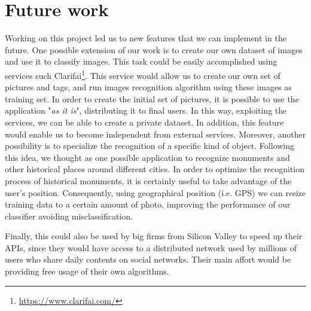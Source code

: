 \section{Future work}
\label{sec:future}

Working on this project led us to new features that we can implement in the 
future.
One possible extension of our work is to create our own dataset of images and 
use it to classify images. This task could be easily accomplished using 
services such Clarifai\footnote{\url{https://www.clarifai.com/}}. This service 
would allow us to create our own set of pictures and tags, and run images 
recognition algorithm using these images as training set. In order to create the 
initial set of pictures, it is possible to use the application "\textit{as it 
is}", distributing it to final users. In this way, exploiting the services, we 
can be able to create a private dataset. In addition, this feature would enable 
us to become independent from external services.
Moreover, another possibility is to specialize the recognition of a specific 
kind of object. Following this idea, we thought as one possible application to 
recognize monuments and other historical places around different cities. In 
order to optimize the recognition process of historical monuments, it is 
certainly useful to take advantage of the user's position. Consequently, using 
geographical position (i.e. GPS) we can resize training data to a certain amount 
of photo, improving the performance of our classifier avoiding 
misclassification.

Finally, this could also be used by big firms from Silicon Valley to speed up 
their APIs, since they would have access to a distributed network used by 
millions of users who share daily contents on social networks. Their main affort 
would be providing free usage of their own algorithms.